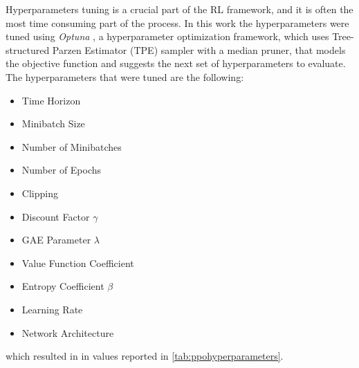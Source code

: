 Hyperparameters tuning is a crucial part of the \ac{RL} framework, and it is often the most time consuming part of the process. In this work the hyperparameters were tuned using \textit{Optuna} \cite{akiba_optuna_2019}, a hyperparameter optimization framework, which uses Tree-structured Parzen Estimator (\ac{TPE}) sampler with a median pruner, that models the objective function and suggests the next set of hyperparameters to evaluate. The hyperparameters that were tuned are the following:

\begin{itemize}
    \item Time Horizon
    \item Minibatch Size
    \item Number of Minibatches
    \item Number of Epochs
    \item Clipping
    \item Discount Factor $\gamma$
    \item GAE Parameter $\lambda$
    \item Value Function Coefficient
    \item Entropy Coefficient $\beta$
    \item Learning Rate
    \item Network Architecture
\end{itemize}

which resulted in in values reported in \cref{tab:ppohyperparameters}.



